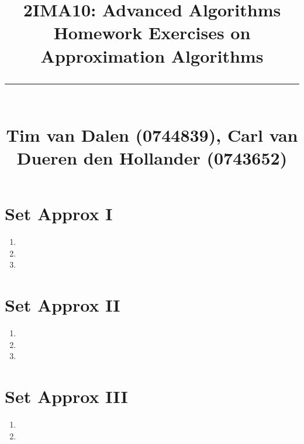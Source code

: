 \documentclass[a4paper,11pt]{article}
\title{
	\huge\raggedright 2IMA10: Advanced Algorithms \hfill\\{\Large Homework Exercises on Approximation Algorithms}\\ \vspace{-0.9\baselineskip}\rule{\linewidth}{1pt}\\
	\small\hfill Tim van Dalen (0744839), Carl van Dueren den Hollander (0743652)
	\normalsize
}
\begin{document}
	\maketitle

	\section*{Set Approx I}
		\begin{enumerate}
			\item 
			\item 
			\item 
		\end{enumerate}
	\section*{Set Approx II}
		\begin{enumerate}
			\item 
			\item 
			\item 
		\end{enumerate}
	\section*{Set Approx III}
		\begin{enumerate}
			\item 
			\item 
		\end{enumerate}
\end{document}
